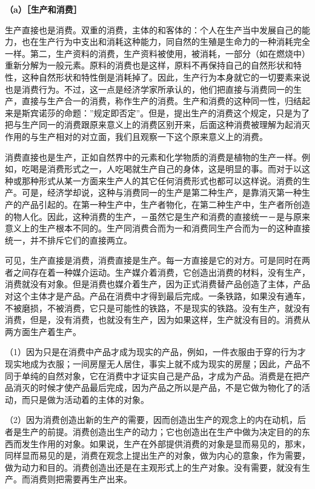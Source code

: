 \documentclass[a4paper,twoside,12pt,AutoFakeBold]{ctexart}
\begin{document}
\textbf{（a）［生产和消费］}

生产直接也是消费。双重的消费，主体的和客体的：个人在生产当中发展自己的能力，也在生产行为中支出和消耗这种能力，同自然的生殖是生命力的一种消耗完全一样。第二，生产资料的消费，生产资料被使用，被消耗，一部分（如在燃烧中）重新分解为一般元素。原料的消费也是这样，原料不再保持自己的自然形状和特性，这种自然形状和特性倒是消耗掉了。因此，生产行为本身就它的一切要素来说也是消费行为。不过，这一点是经济学家所承认的，他们把直接与消费同一的生产，直接与生产合一的消费，称作生产的消费。生产和消费的这种同一性，归结起来是斯宾诺莎的命题：”规定即否定”。但是，提出生产的消费这个规定，只是为了把与生产同一的消费跟原来意义上的消费区别开来，后面这种消费被理解为起消灭作用的与生产相对的对立面，我们且观察一下这个原来意义上的消费。

消费直接也是生产，正如自然界中的元素和化学物质的消费是植物的生产一样。例如，吃喝是消费形式之一，人吃喝就生产自己的身体，这是明显的事。而对于以这种或那种形式从某一方面来生产人的其它任何消费形式也都可以这样说。消费的生产。可是，经济学却说，这种与消费同一的生产是第二种生产，是靠消灭第一种生产的产品引起的。在第一种生产中，生产者物化，在第二种生产中，生产者所创造的物人化。因此，这种消费的生产，－虽然它是生产和消费的直接统一－是与原来意义上的生产根本不同的。生产同消费合而为一和消费同生产合而为一的这种直接统一，并不排斥它们的直接两立。

可见，生产直接是消费，消费直接是生产。每一方直接是它的对方。可是同时在两者之间存在着一种媒介运动。生产媒介着消费，它创造出消费的材料，没有生产，消费就没有对象。但是消费也媒介着生产，因为正式消费替产品创造了主体，产品对这个主体才是产品。产品在消费中才得到最后完成。一条铁路，如果没有通车，不被磨损，不被消费，它只是可能性的铁路，不是现实的铁路。没有生产，就没有消费，但是，没有消费，也就没有生产，因为如果这样，生产就没有目的。消费从两方面生产着生产。

（1）因为只是在消费中产品才成为现实的产品，例如，一件衣服由于穿的行为才现实地成为衣服；一间房屋无人居住，事实上就不成为现实的房屋；因此，产品不同于单纯的自然对象，它在消费中才证实自己是产品，才成为产品。消费是在把产品消灭的时候才使产品最后完成，因为产品之所以是产品，不是它做为物化了的活动，而只是做为活动着的主体的对象。

（2）因为消费创造出新的生产的需要，因而创造出生产的观念上的内在动机，后者是生产的前提。消费创造出生产的动力；它也创造出在生产中做为决定目的的东西而发生作用的对象。如果说，生产在外部提供消费的对象是显而易见的，那末，同样显而易见的是，消费在观念上提出生产的对象，做为内心的意象，作为需要，做为动力和目的。消费创造出还是在主观形式上的生产对象。没有需要，就没有生产。而消费则把需要再生产出来。
\end{document}
